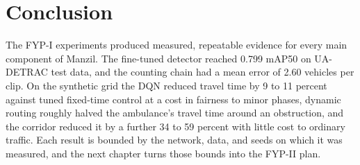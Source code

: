 \section{Conclusion}

The FYP-I experiments produced measured, repeatable evidence for every main component of Manzil. The fine-tuned detector reached 0.799 mAP50 on UA-DETRAC test data, and the counting chain had a mean error of 2.60 vehicles per clip. On the synthetic grid the DQN reduced travel time by 9 to 11 percent against tuned fixed-time control at a cost in fairness to minor phases, dynamic routing roughly halved the ambulance's travel time around an obstruction, and the corridor reduced it by a further 34 to 59 percent with little cost to ordinary traffic. Each result is bounded by the network, data, and seeds on which it was measured, and the next chapter turns those bounds into the FYP-II plan.
